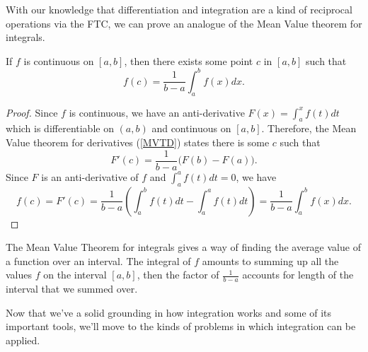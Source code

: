 With our knowledge that differentiation and integration are a kind of reciprocal operations via the FTC, we can prove an analogue of the Mean Value theorem for integrals.
\begin{thm}
  If $f$ is continuous on $[a,b]$, then there exists some point $c$ in $[a,b]$ such that
  \begin{equation}
    f(c)=\frac{1}{b-a}\int_{a}^{b}f(x)dx.
  \end{equation}
\end{thm}
\begin{proof}
  Since $f$ is continuous, we have an anti-derivative $F(x)=\int_{a}^{x}f(t)dt$ which is differentiable on $(a,b)$ and continuous on $[a,b]$. Therefore, the Mean Value theorem for derivatives (\cref{MVTD}) states there is some $c$ such that
  \begin{equation}
    F'(c)=\frac{1}{b-a}\big(F(b)-F(a) \big).
  \end{equation}
  Since $F$ is an anti-derivative of $f$ and $\int_{a}^{a}f(t)dt=0$, we have
\begin{equation}
  f(c)=F'(c)=\frac{1}{b-a}\left( \int_{a}^{b}f(t)dt-\int_{a}^{a}f(t)dt \right)=\frac{1}{b-a}\int_{a}^{b}f(x)dx.
\end{equation}
\end{proof}
\begin{rem}
  The Mean Value Theorem for integrals gives a way of finding the average value of a function over an interval. The integral of $f$ amounts to summing up all the values $f$ on the interval $[a,b]$, then the factor of $\frac{1}{b-a}$ accounts for length of the interval that we summed over.
\end{rem}

Now that we've a solid grounding in how integration works and some of its important tools, we'll move to the kinds of problems in which integration can be applied.
